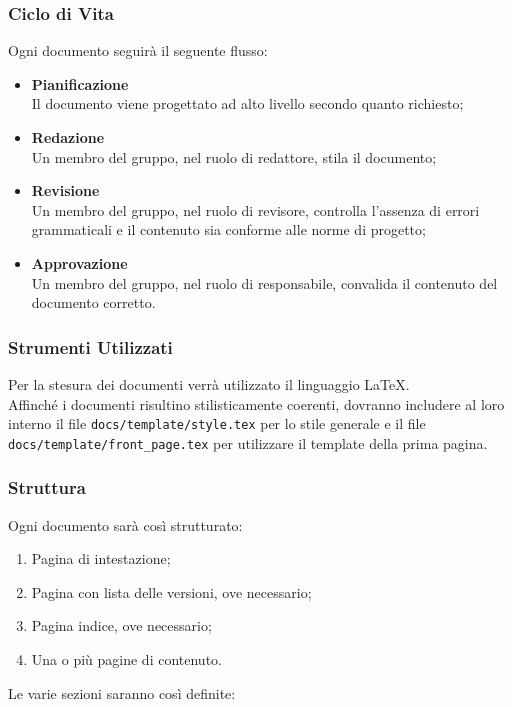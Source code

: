 \documentclass[a4paper, 12pt]{article}
\begin{document}
\subsubsection{Ciclo di Vita}
Ogni documento seguirà il seguente flusso:
\begin{itemize}
    \item \textbf{Pianificazione} \\ Il documento viene progettato ad alto livello secondo quanto richiesto;
    \item \textbf{Redazione} \\ Un membro del gruppo, nel ruolo di redattore, stila il documento;
    \item \textbf{Revisione} \\ Un membro del gruppo, nel ruolo di revisore, controlla l'assenza di errori grammaticali e il contenuto sia conforme alle norme di progetto;
    \item \textbf{Approvazione} \\ Un membro del gruppo, nel ruolo di responsabile, convalida il contenuto del documento corretto.
\end{itemize}

\subsubsection{Strumenti Utilizzati}
Per la stesura dei documenti verrà utilizzato il linguaggio \LaTeX. \\
Affinché i documenti risultino stilisticamente coerenti, dovranno includere al loro interno il file \texttt{docs/template/style.tex} per lo stile generale e il file \texttt{docs/template/front\_page.tex} per utilizzare il template della prima pagina.

\subsubsection{Struttura}
Ogni documento sarà così strutturato:
\begin{enumerate}
    \item Pagina di intestazione;
    \item Pagina con lista delle versioni, ove necessario;
    \item Pagina indice, ove necessario;
    \item Una o più pagine di contenuto.
\end{enumerate}

Le varie sezioni saranno così definite: \\
\end{document}
